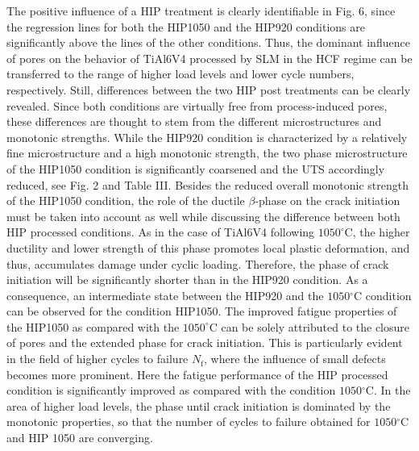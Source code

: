 \documentclass[10pt]{article}
\begin{document}
The positive influence of a HIP treatment is clearly identifiable in Fig. 6, since the regression lines for both the HIP1050 and the HIP920 conditions are significantly above the lines of the other conditions. Thus, the dominant influence of pores on the behavior of TiAl6V4 processed by SLM in the HCF regime can be transferred to the range of higher load levels and lower cycle numbers, respectively. Still, differences between the two HIP post treatments can be clearly revealed. Since both conditions are virtually free from process-induced pores, these differences are thought to stem from the different microstructures and monotonic strengths. While the HIP920 condition is characterized by a relatively fine microstructure and a high monotonic strength, the two phase microstructure of the HIP1050 condition is significantly coarsened and the UTS accordingly reduced, see Fig. 2 and Table III. Besides the reduced overall monotonic strength of the HIP1050 condition, the role of the ductile $\beta$-phase on the crack initiation must be taken into account as well while discussing the difference between both HIP processed conditions. As in the case of TiAl6V4 following $1050^{\circ} \mathrm{C}$, the higher ductility and lower strength of this phase promotes local plastic deformation, and thus, accumulates damage under cyclic loading. Therefore, the phase of crack initiation will be significantly shorter than in the HIP920 condition. As a consequence, an intermediate state between the HIP920 and the $1050{ }^{\circ} \mathrm{C}$ condition can be observed for the condition HIP1050. The improved fatigue properties of the HIP1050 as compared with the $1050^{\circ} \mathrm{C}$ can be solely attributed to the closure of pores and the extended phase for crack initiation. This is particularly evident in the field of higher cycles to failure $N_{\mathrm{f}}$, where the influence of small defects becomes more prominent. Here the fatigue performance of the HIP processed condition is significantly improved as compared with the condition $1050{ }^{\circ} \mathrm{C}$. In the area of higher load levels, the phase until crack initiation is dominated by the monotonic properties, so that the number of cycles to failure obtained for $1050{ }^{\circ} \mathrm{C}$ and HIP 1050 are converging.
\end{document}
